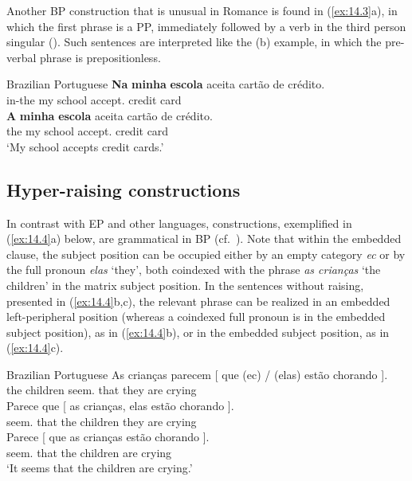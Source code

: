 \documentclass[output=paper]{langsci/langscibook}
\begin{document}
Another \gls{BP} construction that is unusual in
Romance is found in (\ref{ex:14.3}a), in which the first phrase is a PP,
immediately followed by a verb in the third person singular
(\citealt{AvelarCyrino2008}). Such sentences are interpreted like the (b)
example, in which the pre-verbal phrase is prepositionless.

\ea%
    \label{ex:14.3}Brazilian Portuguese
	\ea
    \gll   \textbf{Na} \textbf{minha} \textbf{escola} aceita {cartão de crédito}.\\
            in-the my school accept.\Tsg{} {credit card}\\
    \ex
    \gll \textbf{A} \textbf{minha} \textbf{escola} aceita {cartão de crédito}.\\
            the my school accept.\Tsg{} {credit card}\\
    \glt    ‘My school accepts credit cards.’
    \z
\z

\subsection{Hyper-raising constructions}\label{sec:14.2.3}

In contrast with \gls{EP} and other  languages, 
constructions, exemplified in (\ref{ex:14.4}a) below, are grammatical in
\gls{BP} (cf.\ \citealt{NunesMartins2010}). Note that within the embedded
clause, the subject position can be occupied either by an empty category
\emph{ec} or by the full pronoun \emph{elas} ‘they’, both coindexed with the
phrase \emph{as crianças} ‘the children’ in the matrix subject position.
In the sentences without raising, presented in (\ref{ex:14.4}b,c), the
relevant phrase can be realized in an embedded left-peripheral position
(whereas a coindexed full pronoun is in the embedded subject position), as in
(\ref{ex:14.4}b), or in the embedded subject position, as in
(\ref{ex:14.4}c).\newpage

\ea%
    \label{ex:14.4}Brazilian Portuguese
	\ea
	\gll    As crianças parecem [ que (ec) / (elas) estão chorando ].\\
            the children seem.\Tpl{} {} that {} {} \hphantom{(}they are crying\\
    \ex
    \gll Parece que [ as crianças, elas estão chorando ].\\
      seem.\Tsg{} that {} the children they are crying\\
    \ex
    \gll    Parece [ que as crianças estão chorando ].\\
            seem.\Tsg{} {} that the children are crying\\
    \glt    ‘It seems that the children are crying.’
    \z
\z
\end{document}
